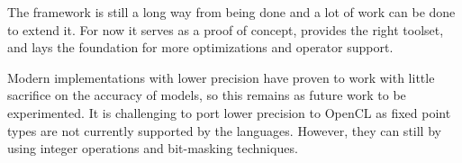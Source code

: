 The framework is still a long way from being done and a lot of work can be done to extend it. For now it serves as a proof of concept, provides the right toolset, and lays the foundation for more optimizations and operator support.

Modern implementations with lower precision have proven to work with little sacrifice on the accuracy of models, so this remains as future work to be experimented. It is challenging to port lower precision to OpenCL as fixed point types are not currently supported by the languages. However, they can still by using integer operations and bit-masking techniques. 




